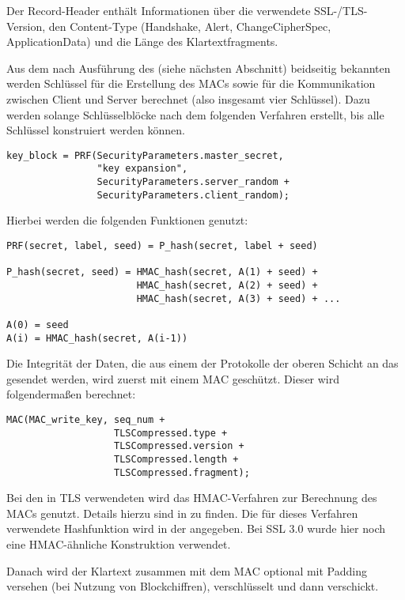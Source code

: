 Der Record-Header enthält Informationen über die verwendete SSL-/TLS-Version, den Content-Type (Handshake, Alert, ChangeCipherSpec, ApplicationData) und die Länge des Klartextfragments.

Aus dem nach Ausführung des \handshakeprotocol{} (siehe nächsten Abschnitt) beidseitig bekannten \mastersecret{} werden Schlüssel für die Erstellung des MACs sowie für die Kommunikation zwischen Client und Server berechnet (also insgesamt vier Schlüssel). Dazu werden solange Schlüsselblöcke nach dem folgenden Verfahren erstellt, bis alle Schlüssel konstruiert werden können. 

\begin{lstlisting}
key_block = PRF(SecurityParameters.master_secret,
                "key expansion",
                SecurityParameters.server_random +
                SecurityParameters.client_random);
\end{lstlisting}

Hierbei werden die folgenden Funktionen genutzt:

\begin{lstlisting}
PRF(secret, label, seed) = P_hash(secret, label + seed)

P_hash(secret, seed) = HMAC_hash(secret, A(1) + seed) +
					   HMAC_hash(secret, A(2) + seed) +
					   HMAC_hash(secret, A(3) + seed) + ...

A(0) = seed
A(i) = HMAC_hash(secret, A(i-1))
\end{lstlisting}


Die Integrität der Daten, die aus einem der Protokolle der oberen Schicht an das \recordprotocol{} gesendet werden, wird zuerst mit einem MAC geschützt. Dieser wird folgendermaßen berechnet:
\begin{lstlisting}
MAC(MAC_write_key, seq_num +
				   TLSCompressed.type +
				   TLSCompressed.version +
				   TLSCompressed.length +
				   TLSCompressed.fragment);
\end{lstlisting}
Bei den in TLS verwendeten \ciphersuites{} wird das HMAC-Verfahren zur Berechnung des MACs genutzt. Details hierzu sind in \cite{hmac97} zu finden. Die für dieses Verfahren verwendete Hashfunktion wird in der \ciphersuite{} angegeben. Bei SSL 3.0 wurde hier noch eine HMAC-ähnliche Konstruktion verwendet.

Danach wird der Klartext zusammen mit dem MAC optional mit Padding versehen (bei Nutzung von Blockchiffren), verschlüsselt und dann verschickt.


